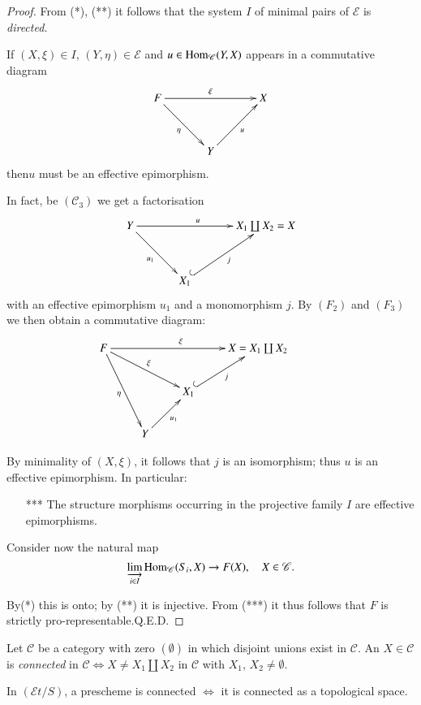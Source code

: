 \begin{proof}
From (*), (**) it follows that the system $I$ of minimal pairs of
$\mathscr{E}$ is {\em directed.}

If $(X,\xi)\in I$, $(Y,\eta)\in\mathscr{E}$ and
$u\in\operatorname{Hom}_{\mathscr{C}}(Y,X)$ appears in a commutative diagram
\[
\xymatrix@=1.2cm{
F\ar[rr]^{\xi}\ar[dr]_{\eta} && X\\
 & Y\ar[ur]_{u} &
}
\]
then\pageoriginale $u$ must be an effective epimorphism.

In fact, be $(\mathscr{C}_{3})$ we get a factorisation
\[
\xymatrix@=1.2cm{
Y\ar[rr]^{u}\ar[dr]_{u_{1}} & & X_{1}\coprod X_{2}=X\\
 & X_{1}\ar@{^{(}->}[ur]_{j}
}
\]
with an effective epimorphism $u_{1}$ and a monomorphism $j$. By
$(F_{2})$ and $(F_{3})$ we then obtain a commutative diagram:
\[
\xymatrix{
F\ar[rrr]^{\xi}\ar[drr]^{\xi}\ar[ddr]_{\eta} & & & X=X_{1}\coprod X_{2}\\
 & & X_{1}\ar@{^{(}->}[ur]_{j} && \\ 
& Y\ar[ur]_{u_{1}} & &
}
\]

By minimality of $(X,\xi)$, it follows that $j$ is an isomorphism;
thus $u$ is an effective epimorphism. In particular:
\begin{itemize}
\item[{*}{**}] The structure morphisms occurring in the projective
  family $I$ are effective epimorphisms.
\end{itemize}

Consider now the natural map
$$
\varinjlim_{i\in I}\operatorname{Hom}_{\mathscr{C}}(S_{i},X)\to F(X),\quad X\in \mathscr{C}.
$$

By\pageoriginale (*) this is onto; by (**) it is injective. From
({*}{**}) it thus follows that $F$ is strictly
pro-representable.\hfill Q.E.D.
\end{proof}

\setcounter{subdefin}{4}
\begin{subdefin}\label{chap4-defi4.4.1.5}
Let $\mathscr{C}$ be a category with zero $(\emptyset)$ in which
disjoint unions exist in $\mathscr{C}$. An $X\in\mathscr{C}$ is {\em
  connected} in $\mathscr{C}\Leftrightarrow X\neq X_{1}\coprod X_{2}$
in $\mathscr{C}$ with $X_{1}$, $X_{2}\neq \emptyset$.
\end{subdefin}

\begin{note*}
In $(\mathscr{E}t/S)$, a prescheme is connected $\Leftrightarrow$ it
is connected as a topological space.
\end{note*}

